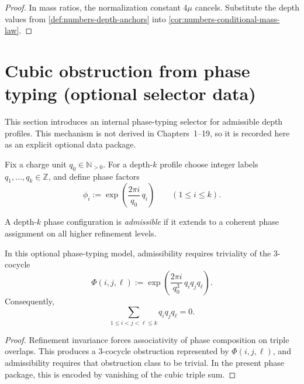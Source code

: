 \begin{proof}
In mass ratios, the normalization constant \(4\mu\) cancels.
Substitute the depth values from
\cref{def:numbers-depth-anchors} into
\cref{cor:numbers-conditional-mass-law}.
\end{proof}

\section{Cubic obstruction from phase typing (optional selector data)}
\label{sec:numbers-cubic}

This section introduces an internal phase-typing selector for admissible
depth profiles.
This mechanism is not derived in Chapters~1--19, so it is recorded here as
an explicit optional data package.

\begin{definition}
\label{def:numbers-phase-data}
Fix a charge unit \(q_0\in\mathbb N_{>0}\).
For a depth-\(k\) profile choose integer labels
\(q_1,\dots,q_k\in\mathbb Z\), and define phase factors
\[
  \phi_i
  :=
  \exp\!\left(\frac{2\pi i}{q_0}\,q_i\right)
  \qquad (1\le i\le k).
\]
\end{definition}

\begin{definition}
\label{def:numbers-phase-admissible}
A depth-\(k\) phase configuration is \emph{admissible} if it extends to a
coherent phase assignment on all higher refinement levels.
\end{definition}

\begin{lemma}
\label{lem:numbers-triple-coherence}
In this optional phase-typing model, admissibility requires triviality of
the \(3\)-cocycle
\[
  \Phi(i,j,\ell)
  :=
  \exp\!\left(\frac{2\pi i}{q_0^3}\,q_iq_jq_\ell\right).
\]
Consequently,
\[
  \sum_{1\le i<j<\ell\le k} q_iq_jq_\ell=0.
\]
\end{lemma}

\begin{proof}
Refinement invariance forces associativity of phase composition on triple
overlaps.
This produces a \(3\)-cocycle obstruction represented by
\(\Phi(i,j,\ell)\), and admissibility requires that obstruction class to be
trivial.
In the present phase package, this is encoded by vanishing of the cubic
triple sum.
\end{proof}


